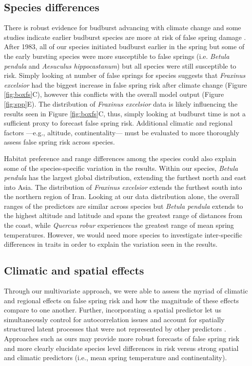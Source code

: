 \documentclass{article}\usepackage[]{graphicx}\usepackage[]{color}
\begin{document}
\subsection*{Species differences}
There is robust evidence for budburst advancing with climate change \citep{Cleland2007, IPCC2014, Wolkovich2012} and some studies indicate earlier budburst species are more at risk of false spring damage \citep{Ma2018}. After 1983, all of our species initiated budburst earlier in the spring but some of the early bursting species were more susceptible to false springs (i.e. \textit{Betula pendula} and \textit{Aesuculus hippocastanum}) but all species were still susceptible to risk. Simply looking at number of false springs for species suggests that \textit{Fraxinus excelsior} had the biggest increase in false spring risk after climate change (Figure \ref{fig:boxfs}C), however this conflicts with the overall model output (Figure \ref{fig:spp}E). The distribution of \textit{Fraxinus excelsior} data is likely influencing the results seen in Figure \ref{fig:boxfs}C, thus, simply looking at budburst time is not a sufficient proxy to forecast false spring risk. Additional climatic and regional factors ---e.g., altitude, continentality--- must be evaluated to more thoroughly assess false spring risk across species.

Habitat preference and range differences among the species could also explain some of the species-specific variation in the results. Within our species, \textit{Betula pendula} has the largest global distribution, extending the furthest north and east into Asia. The distribution of \textit{Fraxinus excelsior} extends the furthest south into the northern region of Iran. Looking at our data distribution alone, the overall ranges of the predictors are similar across species but \textit{Betula pendula} extends to the highest altitude and latitude and spans the greatest range of distances from the coast, while \textit{Quercus robur} experiences the greatest range of mean spring temperatures. However, we would need more species to investigate inter-specific differences in traits in order to explain the variation seen in the results.  
  
\subsection*{Climatic and spatial effects}
Through our multivariate approach, we were able to assess the myriad of climatic and regional effects on false spring risk and how the magnitude of these effects compare to one another. Further, incorporating a spatial predictor let us simultaneously control for autocorrelation issues and account for spatially structured latent processes that were not represented by other predictors \citep{griffith2006spatial,diniz2012selection,morales2012imprint,Baumen2017}. Approaches such as ours may provide more robust forecasts of false spring risk and more clearly elucidate species level differences in risk versus strong spatial and climatic predictors (i.e., mean spring temperature and continentality). 
\end{document}
